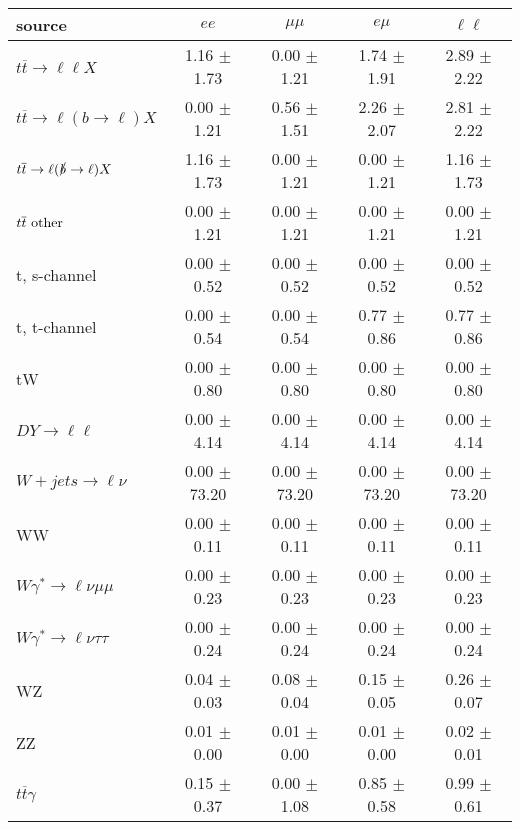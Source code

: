\begin{tabular}{l|cccc} \hline\hline
source & $ee$ & $\mu\mu$ & $e\mu$ & $\ell\ell $ \\
\hline
$t\overline{t} \rightarrow \ell \ell X$ &  1.16 $\pm$  1.73 &  0.00 $\pm$  1.21 &  1.74 $\pm$  1.91 &  2.89 $\pm$  2.22 \\
$t\overline{t} \rightarrow \ell (b \rightarrow \ell) X$ &  0.00 $\pm$  1.21 &  0.56 $\pm$  1.51 &  2.26 $\pm$  2.07 &  2.81 $\pm$  2.22 \\
$t\overline{t} \rightarrow \ell (\slashed b \rightarrow \ell) X$ &  1.16 $\pm$  1.73 &  0.00 $\pm$  1.21 &  0.00 $\pm$  1.21 &  1.16 $\pm$  1.73 \\
        $t\overline{t}\ \rm{other}$ &  0.00 $\pm$  1.21 &  0.00 $\pm$  1.21 &  0.00 $\pm$  1.21 &  0.00 $\pm$  1.21 \\
\hline
                       t, s-channel &  0.00 $\pm$  0.52 &  0.00 $\pm$  0.52 &  0.00 $\pm$  0.52 &  0.00 $\pm$  0.52 \\
                       t, t-channel &  0.00 $\pm$  0.54 &  0.00 $\pm$  0.54 &  0.77 $\pm$  0.86 &  0.77 $\pm$  0.86 \\
                                 tW &  0.00 $\pm$  0.80 &  0.00 $\pm$  0.80 &  0.00 $\pm$  0.80 &  0.00 $\pm$  0.80 \\
\hline
         $DY \rightarrow \ell \ell$ &  0.00 $\pm$  4.14 &  0.00 $\pm$  4.14 &  0.00 $\pm$  4.14 &  0.00 $\pm$  4.14 \\
      $W+jets \rightarrow \ell \nu$ &  0.00 $\pm$ 73.20 &  0.00 $\pm$ 73.20 &  0.00 $\pm$ 73.20 &  0.00 $\pm$ 73.20 \\
                                 WW &  0.00 $\pm$  0.11 &  0.00 $\pm$  0.11 &  0.00 $\pm$  0.11 &  0.00 $\pm$  0.11 \\
\hline
$W\gamma^{*} \rightarrow \ell \nu \mu\mu$ &  0.00 $\pm$  0.23 &  0.00 $\pm$  0.23 &  0.00 $\pm$  0.23 &  0.00 $\pm$  0.23 \\
$W\gamma^{*} \rightarrow \ell \nu \tau\tau$ &  0.00 $\pm$  0.24 &  0.00 $\pm$  0.24 &  0.00 $\pm$  0.24 &  0.00 $\pm$  0.24 \\
                                 WZ &  0.04 $\pm$  0.03 &  0.08 $\pm$  0.04 &  0.15 $\pm$  0.05 &  0.26 $\pm$  0.07 \\
                                 ZZ &  0.01 $\pm$  0.00 &  0.01 $\pm$  0.00 &  0.01 $\pm$  0.00 &  0.02 $\pm$  0.01 \\
\hline
              $t\overline{t}\gamma$ &  0.15 $\pm$  0.37 &  0.00 $\pm$  1.08 &  0.85 $\pm$  0.58 &  0.99 $\pm$  0.61 \\

\end{tabular}
